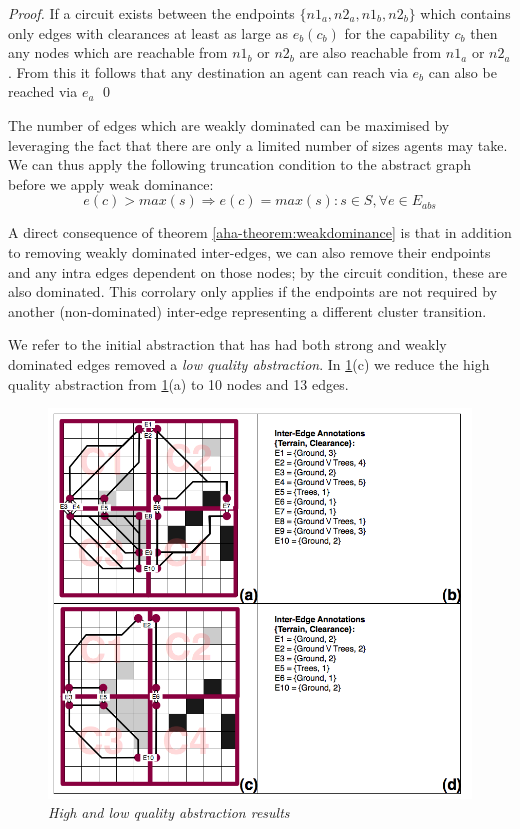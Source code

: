\begin{proof}
If a circuit exists between the endpoints $\lbrace n1_{a}, n2_{a}, n1_{b}, n2_{b} \rbrace$ which contains only edges with clearances at least as large as $e_{b}(c_{b})$ for the capability $c_{b}$ then any nodes which are reachable from $n1_{b}$ or $n2_{b}$ are also reachable from $n1_{a}$ or $n2_{a}$.
From this it follows that any destination an agent can reach via $e_{b}$ can also be reached via $e_{a}$ \qed
\end{proof}
The number of edges which are weakly dominated can be maximised by leveraging the fact that there are only a limited number of sizes agents may take. We can thus apply the following truncation condition to the abstract graph before we apply weak dominance:
\begin{equation}
e(c) > max(s) \Rightarrow e(c) = max(s) : s \in S, \forall e \in E_{abs}
\end{equation}
\par \indent
A direct consequence of theorem \ref{aha-theorem:weakdominance} is that in addition to removing weakly dominated inter-edges, we can also remove their endpoints and any intra edges dependent on those nodes; by the circuit condition, these are also dominated. 
This corrolary only applies if the endpoints are not required by another (non-dominated) inter-edge representing a different cluster transition. 
\par \indent
We refer to the initial abstraction that has had both strong and weakly dominated edges removed a \emph{low quality abstraction}.
In \ref{aha-fig:abstractgraph}(c) we reduce the high quality abstraction from \ref{aha-fig:abstractgraph}(a) to 10 nodes and 13 edges.
\begin{figure}[htbp]
        \caption{\emph{High and low quality abstraction results} }
        \begin{center}
                        \includegraphics[scale=0.25]{diagrams/abstraction_result.png}
        \end{center}
        \label{aha-fig:abstractgraph}
\end{figure}
